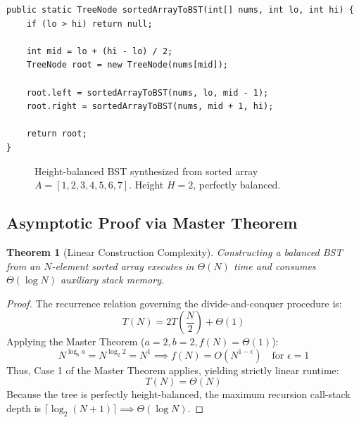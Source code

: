 \documentclass[10pt,journal,compsoc,onecolumn]{IEEEtran}
\newtheorem{theorem}{Theorem}
\begin{document}
\begin{verbatim}
public static TreeNode sortedArrayToBST(int[] nums, int lo, int hi) {
    if (lo > hi) return null;

    int mid = lo + (hi - lo) / 2;
    TreeNode root = new TreeNode(nums[mid]);

    root.left = sortedArrayToBST(nums, lo, mid - 1);
    root.right = sortedArrayToBST(nums, mid + 1, hi);

    return root;
}
\end{verbatim}

\begin{figure}[htbp]
\centering
{}
\caption{Height-balanced BST synthesized from sorted array $A = [1, 2, 3, 4, 5, 6, 7]$. Height $H = 2$, perfectly balanced.}
\label{fig:balanced_construction}
\end{figure}

\subsection{Asymptotic Proof via Master Theorem}
\begin{theorem}[Linear Construction Complexity]
Constructing a balanced BST from an $N$-element sorted array executes in $\Theta(N)$ time and consumes $\Theta(\log N)$ auxiliary stack memory.
\end{theorem}
\begin{proof}
The recurrence relation governing the divide-and-conquer procedure is:
\begin{equation}
    T(N) = 2T\left(\frac{N}{2}\right) + \Theta(1)
\end{equation}
Applying the Master Theorem ($a = 2, b = 2, f(N) = \Theta(1)$):
\begin{equation}
    N^{\log_b a} = N^{\log_2 2} = N^1 \implies f(N) = O(N^{1 - \epsilon}) \quad \text{for } \epsilon = 1
\end{equation}
Thus, Case 1 of the Master Theorem applies, yielding strictly linear runtime:
\begin{equation}
    T(N) = \Theta(N)
\end{equation}
Because the tree is perfectly height-balanced, the maximum recursion call-stack depth is $\lceil \log_2(N + 1) \rceil \implies \Theta(\log N)$.
\end{proof}
\end{document}
